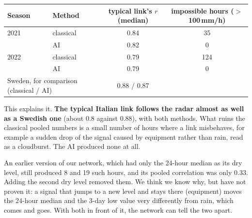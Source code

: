 \begin{center}\small
\begin{tabular}{llcc}
\toprule
Season & Method & typical link's $r$ (median) & impossible hours ($>$100\,mm/h)\\
\midrule
2021 & classical & 0.84 & 35\\
     & AI        & 0.82 & 0\\
2022 & classical & 0.79 & 124\\
     & AI        & 0.79 & 0\\
\midrule
\multicolumn{2}{l}{Sweden, for comparison (classical / AI)} & 0.88 / 0.87 & \\
\bottomrule
\end{tabular}
\end{center}

This explains it. \textbf{The typical Italian link follows the radar almost as well as a Swedish one} (about 0.8
against 0.88), with both methods. What ruins the classical pooled numbers is a small number of hours where a link
misbehaves, for example a sudden drop of the signal caused by equipment rather than rain, read as a cloudburst. The
AI produced none at all.

An earlier version of our network, which had only the 24-hour median as its dry level, still produced 8 and 19 such
hours, and its pooled correlation was only 0.33. Adding the second dry level removed them. We think we know why, but
have not proven it: a signal that jumps to a new level and stays there (equipment) moves the 24-hour median and the
3-day low value very differently from rain, which comes and goes. With both in front of it, the network can tell the
two apart.

